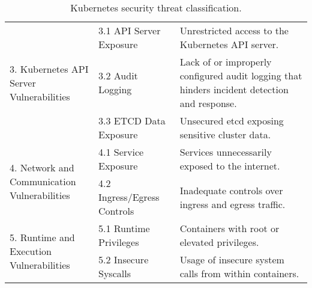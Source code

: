 \begin{table}[H]
\begin{center}
\begin{tabular}{ | p{} | p{} | p{} | }
        \multirow{3}{*}{\parbox{.20\textwidth}{3. Kubernetes API \\ Server Vulnerabilities}} 
        & 3.1 API Server Exposure & Unrestricted access to the Kubernetes API server. \\ \cline{2-3} 
        & 3.2 Audit Logging & Lack of or improperly configured audit logging that hinders incident detection and response. \\ \cline{2-3} 
        & 3.3 ETCD Data Exposure & Unsecured etcd exposing sensitive cluster data. \\ \hline

        \multirow{2}{*}{\parbox{.20\textwidth}{4. Network and \\ Communication Vulnerabilities}} 
        & 4.1 Service Exposure & Services unnecessarily exposed to the internet. \\ \cline{2-3} 
        & 4.2 Ingress/Egress Controls & Inadequate controls over ingress and egress traffic. \\ \hline

        \multirow{2}{*}{\parbox{.20\textwidth}{5. Runtime and \\ Execution Vulnerabilities}} 
        & 5.1 Runtime Privileges & Containers with root or elevated privileges. \\ \cline{2-3} 
        & 5.2 Insecure Syscalls & Usage of insecure system calls from within containers. \\ \hline
        \end{tabular}
\end{center}
\caption{Kubernetes security threat classification.}
\label{tab:kubernetes-security-threat-classification}
\end{table}